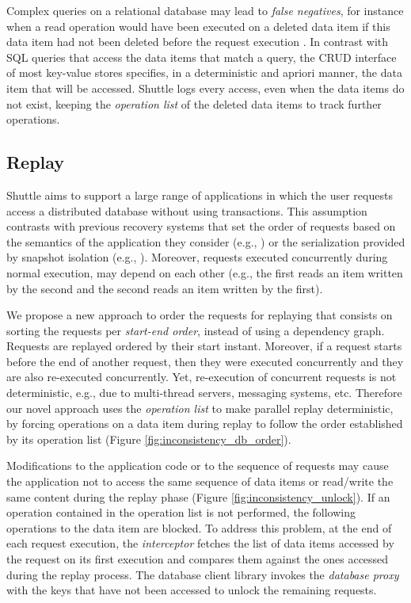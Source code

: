 Complex queries on a relational database may lead to \emph{false negatives}, for instance when a read operation would have been executed on a deleted data item if this data item had not been deleted before the request execution \cite{Xie2008}. In contrast with SQL queries that access the data items that match a query, the \ac{CRUD} interface of most key-value stores specifies, in a deterministic and apriori manner, the data item that will be accessed. Shuttle logs every access, even when the data items do not exist, keeping the \emph{operation list} of the deleted data items to track further operations.


\subsection{Replay}
\label{sec:recovery:replay}

Shuttle aims to support a large range of applications in which the user requests access a distributed database without using transactions. This assumption contrasts with previous recovery systems that set the order of requests based on the semantics of the application they consider (e.g., \cite{undoForOperators}) or the serialization provided by snapshot isolation (e.g., \cite{Akkus2010}). Moreover, requests executed concurrently during  normal execution, may  depend on each other (e.g., the first reads an item written by the second and the second reads an item written by the first).

We propose a new approach to order the requests for replaying that consists on sorting the requests per \emph{start-end order}, instead of using a dependency graph. Requests are replayed ordered by their start instant. Moreover, if a request starts before the end of another request, then they were executed concurrently and they are also re-executed concurrently. 
Yet, re-execution of concurrent requests is not deterministic, e.g., due to multi-thread servers, messaging systems, etc. Therefore our novel approach uses the \emph{operation list} to make parallel replay deterministic, by forcing operations on a data item during replay to follow the order established by its operation list (Figure \ref{fig:inconsistency_db_order}).

Modifications to the application code or to the sequence of requests may cause the application not to access the same sequence of data items or read/write the same content during the replay phase (Figure \ref{fig:inconsistency_unlock}). If an operation contained in the operation list is not performed, the following operations to the data item are blocked. To address this problem, at the end of each request execution, the \textit{interceptor} fetches the list of data items accessed by the request on its first execution and compares them against the ones accessed during the replay process. The database client library invokes the \emph{database proxy} with the keys that have not been accessed to unlock the remaining requests. 


